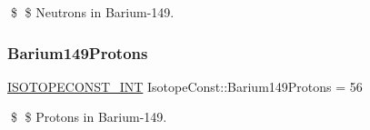 \$ \$ Neutrons in Barium-\/149. \mbox{\label{group___isotope_const-_barium-_ba149_ga76d871946b17a22f8deca7531999a5f6}} 
\subsubsection{\texorpdfstring{Barium149\+Protons}{Barium149Protons}}
{\footnotesize\ttfamily \mbox{\hyperlink{group___isotope_const-_macros_ga5f18360b3e99483a35c32d789e62621c}{I\+S\+O\+T\+O\+P\+E\+C\+O\+N\+S\+T\+\_\+\+I\+NT}} Isotope\+Const\+::\+Barium149\+Protons = 56}

\$ \$ Protons in Barium-\/149. 